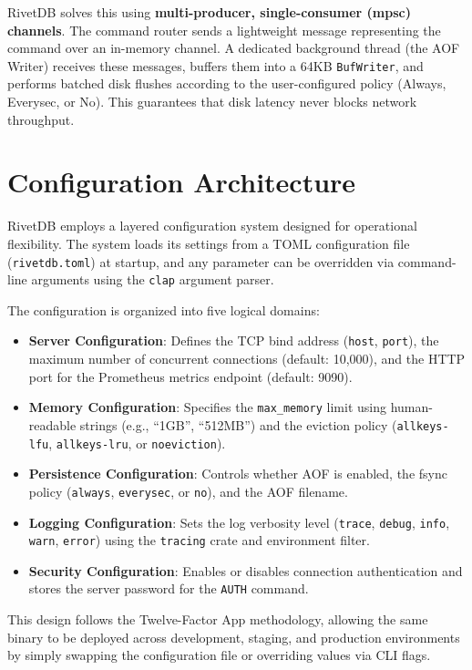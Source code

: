 RivetDB solves this using \textbf{multi-producer, single-consumer (mpsc) channels}. The command router sends a lightweight message representing the command over an in-memory channel. A dedicated background thread (the AOF Writer) receives these messages, buffers them into a 64KB \texttt{BufWriter}, and performs batched disk flushes according to the user-configured policy (Always, Everysec, or No). This guarantees that disk latency never blocks network throughput.

\section{Configuration Architecture}

RivetDB employs a layered configuration system designed for operational flexibility. The system loads its settings from a TOML configuration file (\texttt{rivetdb.toml}) at startup, and any parameter can be overridden via command-line arguments using the \texttt{clap} argument parser.

The configuration is organized into five logical domains:

\begin{itemize}[leftmargin=2.5em]
    \item \textbf{Server Configuration}: Defines the TCP bind address (\texttt{host}, \texttt{port}), the maximum number of concurrent connections (default: 10,000), and the HTTP port for the Prometheus metrics endpoint (default: 9090).
    \item \textbf{Memory Configuration}: Specifies the \texttt{max\_memory} limit using human-readable strings (e.g., ``1GB'', ``512MB'') and the eviction policy (\texttt{allkeys-lfu}, \texttt{allkeys-lru}, or \texttt{noeviction}).
    \item \textbf{Persistence Configuration}: Controls whether AOF is enabled, the fsync policy (\texttt{always}, \texttt{everysec}, or \texttt{no}), and the AOF filename.
    \item \textbf{Logging Configuration}: Sets the log verbosity level (\texttt{trace}, \texttt{debug}, \texttt{info}, \texttt{warn}, \texttt{error}) using the \texttt{tracing} crate and environment filter.
    \item \textbf{Security Configuration}: Enables or disables connection authentication and stores the server password for the \texttt{AUTH} command.
\end{itemize}

This design follows the Twelve-Factor App methodology, allowing the same binary to be deployed across development, staging, and production environments by simply swapping the configuration file or overriding values via CLI flags.

